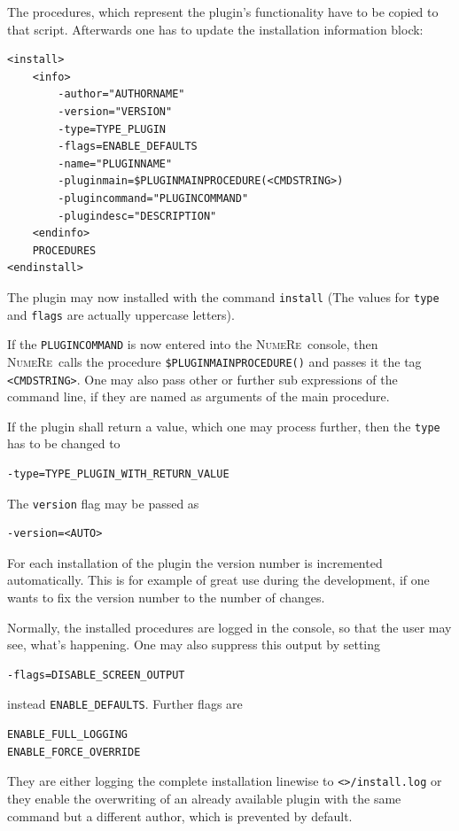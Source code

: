 \documentclass[DIV=14,headsepline,footsepline]{scrbook}
\newcommand{\NR}{\textsc{Nu\-me\-Re}}
\begin{document}
				The procedures, which represent the plugin's functionality have to be copied to that script. Afterwards one has to update the installation information block:
				\begin{lstlisting}
<install>
	<info>
		-author="AUTHORNAME"
		-version="VERSION"
		-type=TYPE_PLUGIN
		-flags=ENABLE_DEFAULTS
		-name="PLUGINNAME"
		-pluginmain=$PLUGINMAINPROCEDURE(<CMDSTRING>)
		-plugincommand="PLUGINCOMMAND"
		-plugindesc="DESCRIPTION"
	<endinfo>
	PROCEDURES
<endinstall>
				\end{lstlisting}
				The plugin may now installed with the command \verb+install+ (The values for \verb+type+ and \verb+flags+ are actually uppercase letters).
				
				If the \verb+PLUGINCOMMAND+ is now entered into the \NR\ console, then \NR\ calls the procedure \verb+$PLUGINMAINPROCEDURE()+ and passes it the tag \verb+<CMDSTRING>+. One may also pass other or further sub expressions of the command line, if they are named as arguments of the main procedure.
				
				If the plugin shall return a value, which one may process further, then the \verb+type+ has to be changed to
				\begin{lstlisting}
-type=TYPE_PLUGIN_WITH_RETURN_VALUE
				\end{lstlisting}
				
				The \verb+version+ flag may be passed as
				\begin{lstlisting}
-version=<AUTO>
				\end{lstlisting}
				For each installation of the plugin the version number is incremented automatically. This is for example of great use during the development, if one wants to fix the version number to the number of changes.
				
				Normally, the installed procedures are logged in the console, so that the user may see, what's happening. One may also suppress this output by setting
				\begin{lstlisting}
-flags=DISABLE_SCREEN_OUTPUT
				\end{lstlisting}
				instead \verb+ENABLE_DEFAULTS+. Further flags are
				\begin{lstlisting}
ENABLE_FULL_LOGGING
ENABLE_FORCE_OVERRIDE
				\end{lstlisting}
				They are either logging the complete installation linewise to \verb+<>/install.log+ or they enable the overwriting of an already available plugin with the same command but a different author, which is prevented by default.
				
\end{document}
